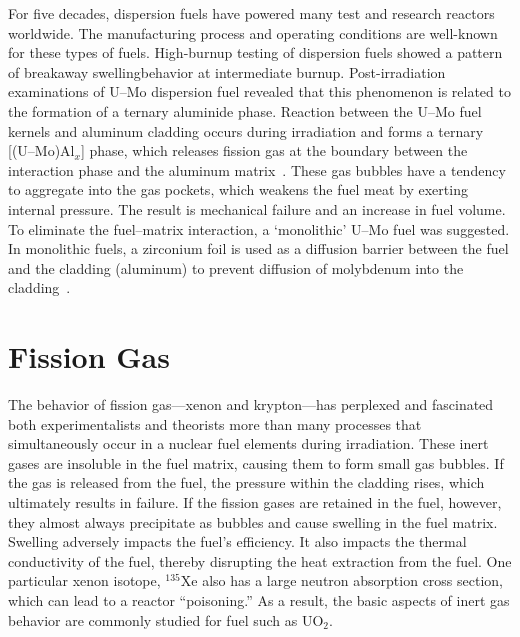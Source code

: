 For five decades, dispersion fuels have powered many test and research reactors worldwide. The manufacturing process and operating conditions are well-known for these types of fuels. High-burnup testing of dispersion fuels showed a pattern of \mbox{breakaway} swelling\footnotemark\@ behavior at intermediate burnup. Post-irradiation examinations of U--Mo dispersion fuel revealed that this phenomenon is related to the formation of a ternary aluminide phase. Reaction between the U--Mo fuel kernels and aluminum cladding occurs during irradiation and forms a ternary [(U--Mo)Al$_x$] phase, which releases fission gas at the boundary between the interaction phase and the aluminum matrix~\cite{leenaers2004post,jue2014microstructural,van2008transmission, olander2009growth}. These gas bubbles have a tendency to aggregate into the gas pockets, which weakens the fuel meat by exerting internal pressure. The result is mechanical failure and an increase in fuel volume. To eliminate the fuel--matrix interaction, a `monolithic' U--Mo fuel was suggested. In monolithic fuels, a zirconium foil is used as a diffusion barrier between the fuel and the cladding (aluminum) to prevent diffusion of molybdenum into the cladding~\cite{jue2014microstructural}.




\section{Fission Gas}
The behavior of fission gas---xenon and krypton---has perplexed and fascinated both experimentalists and theorists more than many processes that simultaneously occur in a nuclear fuel elements during irradiation. These inert gases are insoluble in the fuel matrix, causing them to form small gas bubbles. If the gas is released from the fuel, the pressure within the cladding rises, which ultimately results in failure. If the fission gases are retained in the fuel, however, they almost always precipitate as bubbles and cause swelling in the fuel matrix. Swelling adversely impacts the fuel's efficiency. It also impacts the thermal conductivity of the fuel, thereby disrupting the heat extraction from the fuel. One particular xenon isotope, $^{135}$Xe also has a large neutron absorption cross section, which can lead to a reactor ``poisoning.'' As a result, the basic aspects of inert gas behavior are commonly studied for fuel such as UO$_2$.

